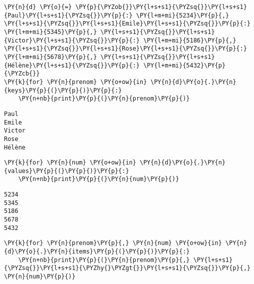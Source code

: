 \documentclass[12pt]{book}
\begin{document}
    \begin{tcolorbox}[breakable, size=fbox, boxrule=1pt, pad at break*=1mm,colback=cellbackground, colframe=cellborder]
\begin{Verbatim}[commandchars=\\\{\}]
\PY{n}{d} \PY{o}{=} \PY{p}{\PYZob{}}\PY{l+s+s1}{\PYZsq{}}\PY{l+s+s1}{Paul}\PY{l+s+s1}{\PYZsq{}}\PY{p}{:} \PY{l+m+mi}{5234}\PY{p}{,} \PY{l+s+s1}{\PYZsq{}}\PY{l+s+s1}{Emile}\PY{l+s+s1}{\PYZsq{}}\PY{p}{:} \PY{l+m+mi}{5345}\PY{p}{,} \PY{l+s+s1}{\PYZsq{}}\PY{l+s+s1}{Victor}\PY{l+s+s1}{\PYZsq{}}\PY{p}{:} \PY{l+m+mi}{5186}\PY{p}{,} \PY{l+s+s1}{\PYZsq{}}\PY{l+s+s1}{Rose}\PY{l+s+s1}{\PYZsq{}}\PY{p}{:} \PY{l+m+mi}{5678}\PY{p}{,} \PY{l+s+s1}{\PYZsq{}}\PY{l+s+s1}{Hélène}\PY{l+s+s1}{\PYZsq{}}\PY{p}{:} \PY{l+m+mi}{5432}\PY{p}{\PYZcb{}}
\PY{k}{for} \PY{n}{prenom} \PY{o+ow}{in} \PY{n}{d}\PY{o}{.}\PY{n}{keys}\PY{p}{(}\PY{p}{)}\PY{p}{:}
    \PY{n+nb}{print}\PY{p}{(}\PY{n}{prenom}\PY{p}{)}
\end{Verbatim}
\end{tcolorbox}

    \begin{Verbatim}[commandchars=\\\{\}]
Paul
Emile
Victor
Rose
Hélène
    \end{Verbatim}

    \begin{tcolorbox}[breakable, size=fbox, boxrule=1pt, pad at break*=1mm,colback=cellbackground, colframe=cellborder]
\begin{Verbatim}[commandchars=\\\{\}]
\PY{k}{for} \PY{n}{num} \PY{o+ow}{in} \PY{n}{d}\PY{o}{.}\PY{n}{values}\PY{p}{(}\PY{p}{)}\PY{p}{:}
    \PY{n+nb}{print}\PY{p}{(}\PY{n}{num}\PY{p}{)}
\end{Verbatim}
\end{tcolorbox}

    \begin{Verbatim}[commandchars=\\\{\}]
5234
5345
5186
5678
5432
    \end{Verbatim}

    \begin{tcolorbox}[breakable, size=fbox, boxrule=1pt, pad at break*=1mm,colback=cellbackground, colframe=cellborder]
\begin{Verbatim}[commandchars=\\\{\}]
\PY{k}{for} \PY{n}{prenom}\PY{p}{,} \PY{n}{num} \PY{o+ow}{in} \PY{n}{d}\PY{o}{.}\PY{n}{items}\PY{p}{(}\PY{p}{)}\PY{p}{:}
    \PY{n+nb}{print}\PY{p}{(}\PY{n}{prenom}\PY{p}{,} \PY{l+s+s1}{\PYZsq{}}\PY{l+s+s1}{\PYZhy{}\PYZgt{}}\PY{l+s+s1}{\PYZsq{}}\PY{p}{,} \PY{n}{num}\PY{p}{)}
\end{Verbatim}
\end{tcolorbox}
\end{document}
